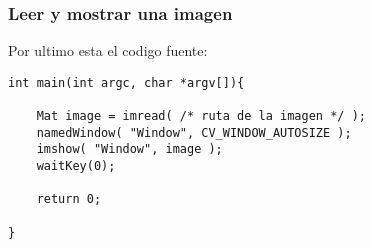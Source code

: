 \begin{frame}[fragile]
   \frametitle{Leer y mostrar una imagen}

    Por ultimo esta el codigo fuente:

    \scriptsize

    \begin{lstlisting}
int main(int argc, char *argv[]){

    Mat image = imread( /* ruta de la imagen */ );
    namedWindow( "Window", CV_WINDOW_AUTOSIZE );
    imshow( "Window", image );
    waitKey(0);

    return 0;

}
    \end{lstlisting}

\end{frame}
